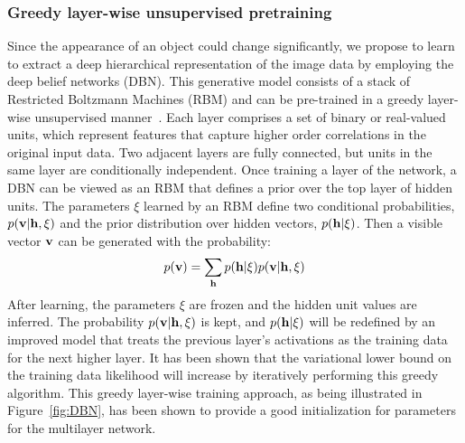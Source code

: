 \documentclass[preprint,12pt,review]{elsarticle}
\begin{document}
\subsubsection{Greedy layer-wise unsupervised pretraining}
Since the appearance of an object could change significantly, we propose to learn to extract a deep hierarchical representation of the image data by employing the deep belief networks (DBN).
%
This generative model consists of a stack of Restricted Boltzmann Machines (RBM) and can be pre-trained in a greedy layer-wise unsupervised manner~\cite{hinton2006fast}.
%
Each layer comprises a set of binary or real-valued units, which represent features that capture higher order correlations in the original input data.
%
Two adjacent layers are fully connected, but units in the same layer are conditionally independent.
%
Once training a layer of the network, a DBN can be viewed as an RBM that defines a prior over the top layer of hidden units.
%
The parameters $\xi$ learned by an RBM define two conditional probabilities, $p({\bf{v}}|{\bf{h}},\xi )$ and the prior distribution over hidden vectors, $p({\bf{h}}|\xi)$.
%
Then a visible vector ${\bf{v}}$ can be generated with the probability:
\begin{equation}
p({\bf{v}}) = \sum\limits_{\bf{h}} {p({\bf{h}}|\xi )} p({\bf{v}}|{\bf{h}},\xi )
\end{equation}
%
After learning, the parameters $\xi$ are frozen and the hidden unit values are inferred. The probability $p({\bf{v}}|{\bf{h}},\xi )$ is kept, and $p({\bf{h}}|\xi )$ will be redefined by an improved model that treats the previous layer's activations as the training data for the next higher layer.
%
It has been shown that the variational lower bound on the training data likelihood will increase by iteratively performing this greedy algorithm.
%
This greedy layer-wise training approach, as being illustrated in Figure~\ref{fig:DBN}, has been shown to provide a good initialization for parameters for the multilayer network.
%
\end{document}
